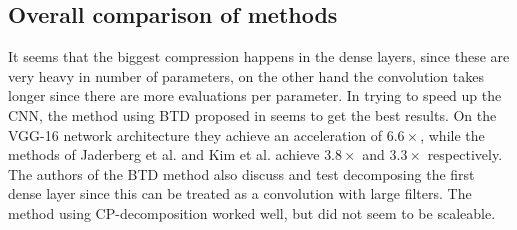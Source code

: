 \subsection{Overall comparison of methods}
It seems that the biggest compression happens in the dense layers, since these are very heavy in number of parameters, on the other hand the convolution takes longer since there are more evaluations per parameter. In trying to speed up the CNN, the method using BTD proposed in \cite{Wang2016} seems to get the best results. On the VGG-16 network architecture\cite{Simonyan2015} they achieve an acceleration of $6.6 \times$, while the methods of Jaderberg et al. \cite{Jaderberg2014} and Kim et al. \cite{Kim2016} achieve $3.8 \times$ and $3.3\times$ respectively. The authors of the BTD method also discuss and test decomposing the first dense layer since this can be treated as a convolution with large filters. The method using CP-decomposition \cite{Lebedev2015} worked well, but did not seem to be scaleable.

